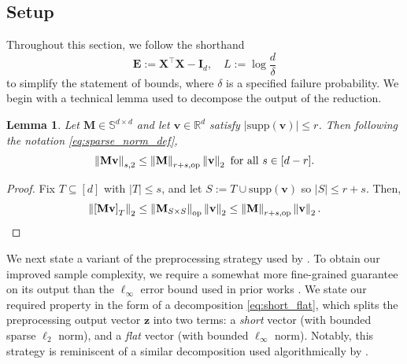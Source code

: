 \documentclass[11pt]{article}
\newtheorem{lemma}{Lemma}
\newcommand{\defeq}{:=}
\newcommand{\norm}[1]{\left\lVert#1\right\rVert}
\newcommand{\normop}[1]{\left\lVert#1\right\rVert_{\textup{op}}}
\newcommand{\R}{\mathbb{R}}
\newcommand{\1}{\mathbf{1}}
\newcommand{\0}{\mathbf{0}}
\newcommand{\id}{\mathbf{I}}
\newcommand{\Brack}[1]{\left[#1\right]}
\newcommand{\Sym}{\mathbb{S}}
\newcommand{\supp}{\mathrm{supp}}
\newcommand{\me}{{\mathbf{E}}}
\newcommand{\mm}{{\mathbf{M}}}
\newcommand{\mx}{{\mathbf{X}}}
\newcommand{\normkop}[2]{{\left\lVert#1\right\rVert_{#2, \textup{op}}}}
\newcommand{\vv}{{\mathbf{v}}}
\newcommand{\vz}{{\mathbf{z}}}
\begin{document}
\subsection{Setup}\label{ssec:slr_setup}

Throughout this section, we follow the shorthand
\[\me \defeq \mx^\top \mx - \id_d,\quad L \defeq \log \frac d \delta\]
to simplify the statement of bounds, where $\delta$ is a specified failure probability. We begin with a technical lemma used to decompose the output of the \cite{KumarSTZ25} reduction.

\begin{lemma}\label{lem:restricted_short}
Let $\mm \in \Sym^{d \times d}$ and let $\vv \in \R^d$ satisfy $|\supp(\vv)| \le r$. Then following the notation \eqref{eq:sparse_norm_def},
\[\norm{\mm \vv}_{s, 2} \le \normkop{\mm }{r + s} \norm{\vv}_2 \text{ for all } s \in [d - r].\]
\end{lemma}
\begin{proof}
Fix $T \subseteq [d]$ with $|T| \le s$, and let $S \defeq T \cup \supp(\vv)$ so $|S| \le r + s$. Then,
\[\norm{\Brack{\mm \vv}_T}_2 \le \normop{\mm_{S \times S}} \norm{\vv}_2 \le \normkop{\mm }{r + s} \norm{\vv}_2.\]
\end{proof}



We next state a variant of the preprocessing strategy used by \cite{KumarSTZ25}. To obtain our improved sample complexity, we require a somewhat more fine-grained guarantee on its output than the $\ell_\infty$ error bound used in prior works \cite{KumarSTZ25, ChenLTZ26}. We state our required property in the form of a decomposition \eqref{eq:short_flat}, which splits the preprocessing output vector $\vz$ into two terms: a \emph{short} vector (with bounded sparse $\ell_2$ norm), and a \emph{flat} vector (with bounded $\ell_\infty$ norm). Notably, this strategy is reminiscent of a similar decomposition used algorithmically by \cite{KelnerLLST23}.
\end{document}
